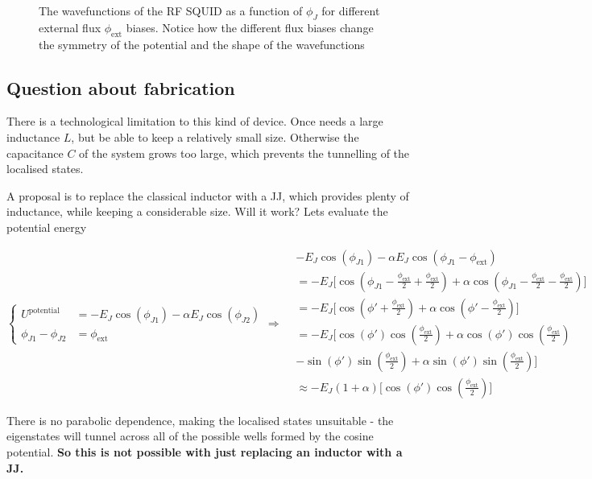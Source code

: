  \begin{figure}[h]
   \caption{The wavefunctions of the RF SQUID as a function of $\phi_J$ for different external
     flux $\phi_\text{ext}$ biases.  Notice how the  different flux biases change the symmetry
     of the potential and the shape of the wavefunctions}
   \label{fig:l3wavefun}
 \end{figure}

 	
 \newpage

 \subsection{Question about fabrication}
 There is  a technological limitation to  this kind of  device. Once needs a  large inductance
 $L$, but  be able to keep  a relatively small  size. Otherwise the  capacitance $ C $  of the
 system grows too large, which prevents the tunnelling of the localised states.
 
 A  proposal is  to  replace  the classical  inductor  with a  JJ,  which  provides plenty  of
 inductance, while  keeping a considerable size.   Will it work?  Lets  evaluate the potential
 energy
 
 \begin{equation}
   \left\lbrace\begin{aligned}
       U^{\text{potential}} & = -E_J\cos(\phi_{J1}) - \alpha E_J\cos(\phi_{J2})\\
       \phi_{J1} - \phi_{J2} & = \phi_\text{ext}
     \end{aligned}\right. \Rightarrow
   \begin{aligned}
     &-E_J\cos(\phi_{J1}) - \alpha E_J\cos(\phi_{J1}-\phi_\text{ext})\\
     & = -E_J\bigg[\cos(\phi_{J1}-\frac{\phi_\text{ext}}{2}+\frac{\phi_\text{ext}}{2}) + \alpha\cos(\phi_{J1}-\frac{\phi_\text{ext}}{2}-\frac{\phi_\text{ext}}{2})\bigg]\\
     & = -E_J\bigg[\cos(\phi'+\frac{\phi_\text{ext}}{2}) + \alpha\cos(\phi'-\frac{\phi_\text{ext}}{2})\bigg]\\
     & = -E_J\bigg[\cos(\phi')\cos(\frac{\phi_\text{ext}}{2}) + \alpha\cos(\phi')\cos(\frac{\phi_\text{ext}}{2})\\
     & - \sin(\phi')\sin(\frac{\phi_\text{ext}}{2}) + \alpha\sin(\phi')\sin(\frac{\phi_\text{ext}}{2}) \bigg]\\
     & \approx -E_J(1+\alpha)\bigg[\cos(\phi')\cos(\frac{\phi_\text{ext}}{2})\bigg]
   \end{aligned}
 \end{equation}

 \noindent There  is no  parabolic dependence,  making the localised  states unsuitable  - the
 eigenstates  will   tunnel  across  all   of  the  possible   wells  formed  by   the  cosine
 potential. \textbf{So this is not possible with just replacing an inductor with a JJ.}
  
 \newpage

